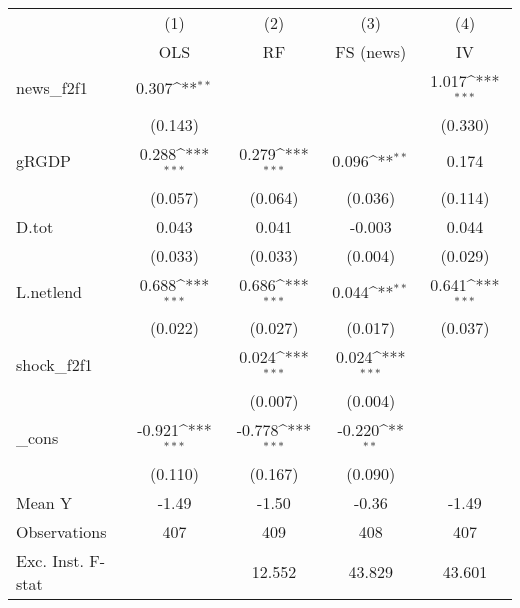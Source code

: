 {
\def\sym#1{\ifmmode^{#1}\else\(^{#1}\)\fi}
\begin{tabular}{l*{4}{c}}
\toprule
            &\multicolumn{1}{c}{(1)}&\multicolumn{1}{c}{(2)}&\multicolumn{1}{c}{(3)}&\multicolumn{1}{c}{(4)}\\
            &\multicolumn{1}{c}{OLS}&\multicolumn{1}{c}{RF}&\multicolumn{1}{c}{FS (news)}&\multicolumn{1}{c}{IV}\\
\midrule
news\_f2f1   &       0.307\sym{**} &                     &                     &       1.017\sym{***}\\
            &     (0.143)         &                     &                     &     (0.330)         \\
\addlinespace
gRGDP       &       0.288\sym{***}&       0.279\sym{***}&       0.096\sym{**} &       0.174         \\
            &     (0.057)         &     (0.064)         &     (0.036)         &     (0.114)         \\
\addlinespace
D.tot       &       0.043         &       0.041         &      -0.003         &       0.044         \\
            &     (0.033)         &     (0.033)         &     (0.004)         &     (0.029)         \\
\addlinespace
L.netlend   &       0.688\sym{***}&       0.686\sym{***}&       0.044\sym{**} &       0.641\sym{***}\\
            &     (0.022)         &     (0.027)         &     (0.017)         &     (0.037)         \\
\addlinespace
shock\_f2f1  &                     &       0.024\sym{***}&       0.024\sym{***}&                     \\
            &                     &     (0.007)         &     (0.004)         &                     \\
\addlinespace
\_cons      &      -0.921\sym{***}&      -0.778\sym{***}&      -0.220\sym{**} &                     \\
            &     (0.110)         &     (0.167)         &     (0.090)         &                     \\
\midrule
Mean Y      &       -1.49         &       -1.50         &       -0.36         &       -1.49         \\
Observations&         407         &         409         &         408         &         407         \\
Exc. Inst. F-stat&                     &      12.552         &      43.829         &      43.601         \\
\bottomrule
\end{tabular}
}
